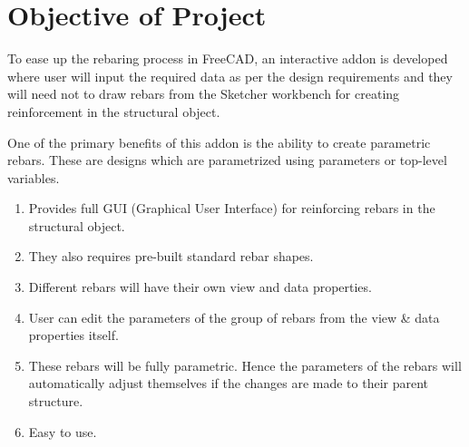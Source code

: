 \section{Objective of Project}

To ease up the rebaring process in FreeCAD, an interactive addon is developed where user will input the required data as per the design requirements and they will need not to draw rebars from the Sketcher workbench for creating reinforcement in the structural object.

One of the primary benefits of this addon is the ability to create parametric rebars. These are designs which are parametrized using parameters or top-level variables.

\begin{enumerate}
    \item Provides full GUI (Graphical User Interface) for reinforcing rebars in the structural object.
    \item They also requires pre-built standard rebar shapes.
    \item Different rebars will have their own view and data properties.
    \item User can edit the parameters of the group of rebars from the view \& data properties itself.
    \item These rebars will be fully parametric. Hence the parameters of the rebars will automatically adjust themselves if the changes are made to their parent structure.
    \item Easy to use. 
\end{enumerate}


%  
%  

